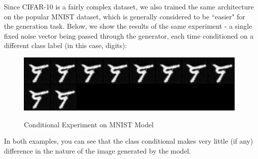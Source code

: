\documentclass[a4paper]{article}
\begin{document}
Since CIFAR-10 is a fairly complex dataset, we also trained the same architecture on the popular MNIST dataset, which is generally considered to be ``easier" for the generation task. Below, we show the results of the same experiment - a single fixed noise vector being passed through the generator, each time conditioned on a different class label (in this case, digits):
\begin{figure}[H]
  \includegraphics[scale=0.5]{images/MNIST_fixed_noise_conditional_fake.png}
  \label{fig:boat1}
  \caption{Conditional Experiment on MNIST Model}
\end{figure}
In both examples, you can see that the class conditional makes very little (if any) difference in the nature of the image generated by the model.
\end{document}
